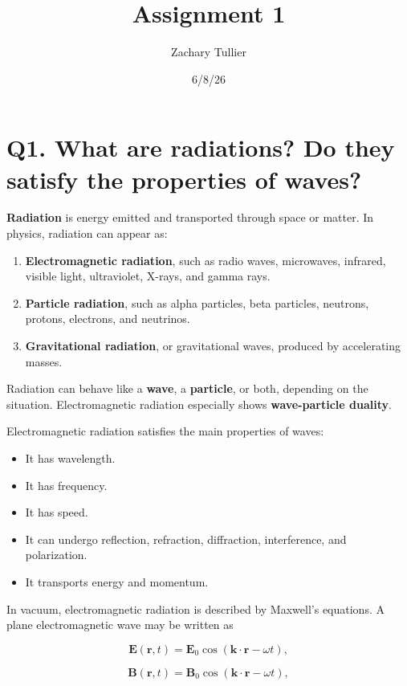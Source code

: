 \documentclass[12pt]{article}
\title{Assignment 1}
\author{Zachary Tullier}
\date{6/8/26}
\begin{document}
\maketitle

\section*{Q1. What are radiations? Do they satisfy the properties of waves?}

\textbf{Radiation} is energy emitted and transported through space or matter. In physics, radiation can appear as:

\begin{enumerate}
    \item \textbf{Electromagnetic radiation}, such as radio waves, microwaves, infrared, visible light, ultraviolet, X-rays, and gamma rays.
    \item \textbf{Particle radiation}, such as alpha particles, beta particles, neutrons, protons, electrons, and neutrinos.
    \item \textbf{Gravitational radiation}, or gravitational waves, produced by accelerating masses.
\end{enumerate}

Radiation can behave like a \textbf{wave}, a \textbf{particle}, or both, depending on the situation. Electromagnetic radiation especially shows \textbf{wave-particle duality}.

Electromagnetic radiation satisfies the main properties of waves:

\begin{itemize}
    \item It has wavelength.
    \item It has frequency.
    \item It has speed.
    \item It can undergo reflection, refraction, diffraction, interference, and polarization.
    \item It transports energy and momentum.
\end{itemize}

In vacuum, electromagnetic radiation is described by Maxwell's equations. A plane electromagnetic wave may be written as

\begin{equation}
\mathbf{E}(\mathbf{r},t)=\mathbf{E}_0\cos(\mathbf{k}\cdot\mathbf{r}-\omega t),
\end{equation}

\begin{equation}
\mathbf{B}(\mathbf{r},t)=\mathbf{B}_0\cos(\mathbf{k}\cdot\mathbf{r}-\omega t),
\end{equation}
\end{document}
